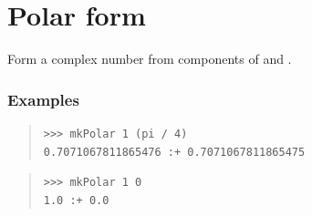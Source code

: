 \section{Polar form}
\begin{haddockdesc}
\item[\begin{tabular}{@{}l}
mkPolar :: Floating a => a -> a -> Complex a
\end{tabular}]
{\haddockbegindoc
Form a complex number from  components of  and .\par
\subsubsection*{\textbf{Examples}}
\begin{quote}
{\haddockverb\begin{verbatim}
>>> mkPolar 1 (pi / 4)
0.7071067811865476 :+ 0.7071067811865475

\end{verbatim}}
\end{quote}
\begin{quote}
{\haddockverb\begin{verbatim}
>>> mkPolar 1 0
1.0 :+ 0.0

\end{verbatim}}
\end{quote}}
\end{haddockdesc}

